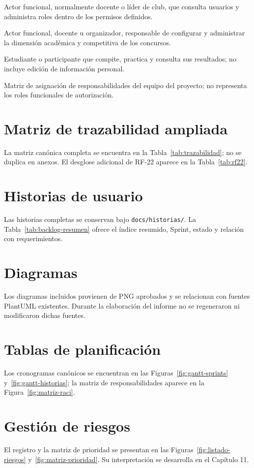 \documentclass[11pt,a4paper]{article}
\begin{document}
\begin{description}[style=nextline]
\item[Administrador de Roles] Actor funcional, normalmente docente o líder de club, que consulta usuarios y administra roles dentro de los permisos definidos.
\item[Administrador de Concursos] Actor funcional, docente u organizador, responsable de configurar y administrar la dimensión académica y competitiva de los concursos.
\item[Usuario] Estudiante o participante que compite, practica y consulta sus resultados; no incluye edición de información personal.
\item[RACI] Matriz de asignación de responsabilidades del equipo del proyecto; no representa los roles funcionales de autorización.
\end{description}

\section{Matriz de trazabilidad ampliada}
La matriz canónica completa se encuentra en la Tabla~\ref{tab:trazabilidad}; no se duplica en anexos. El desglose adicional de RF-22 aparece en la Tabla~\ref{tab:rf22}.

\section{Historias de usuario}
Las historias completas se conservan bajo \texttt{docs/historias/}. La Tabla~\ref{tab:backlog-resumen} ofrece el índice resumido, Sprint, estado y relación con requerimientos.

\section{Diagramas}
Los diagramas incluidos provienen de PNG aprobados y se relacionan con fuentes PlantUML existentes. Durante la elaboración del informe no se regeneraron ni modificaron dichas fuentes.

\section{Tablas de planificación}
Los cronogramas canónicos se encuentran en las Figuras~\ref{fig:gantt-sprints} y~\ref{fig:gantt-historias}; la matriz de responsabilidades aparece en la Figura~\ref{fig:matriz-raci}.

\section{Gestión de riesgos}
El registro y la matriz de prioridad se presentan en las Figuras~\ref{fig:listado-riesgos} y~\ref{fig:matriz-prioridad}. Su interpretación se desarrolla en el Capítulo 11.
\end{document}
